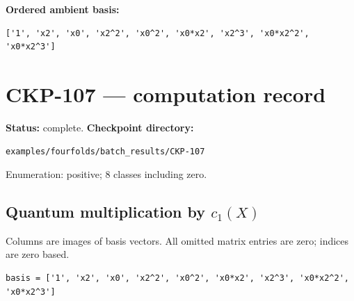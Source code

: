 \documentclass[10pt,a4paper]{article}
\begin{document}
\textbf{Ordered ambient basis:}
\begin{lstlisting}
['1', 'x2', 'x0', 'x2^2', 'x0^2', 'x0*x2', 'x2^3', 'x0*x2^2', 'x0*x2^3']
\end{lstlisting}

\clearpage\section*{CKP-107 --- computation record}
\textbf{Status:} complete.
\textbf{Checkpoint directory:}
\begin{lstlisting}
examples/fourfolds/batch_results/CKP-107
\end{lstlisting}

Enumeration: positive; 8 classes including zero.
\subsection*{Quantum multiplication by $c_1(X)$}
Columns are images of basis vectors. All omitted matrix entries are zero; indices are zero based.

\begin{lstlisting}
basis = ['1', 'x2', 'x0', 'x2^2', 'x0^2', 'x0*x2', 'x2^3', 'x0*x2^2', 'x0*x2^3']
\end{lstlisting}
\end{document}
